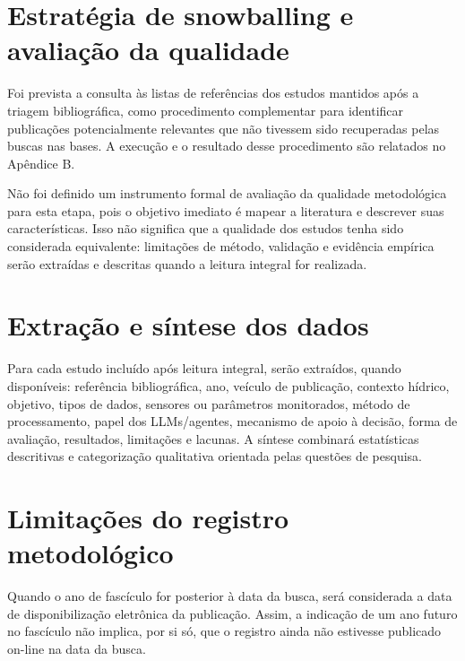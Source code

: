 \section{Estratégia de snowballing e avaliação da qualidade}

Foi prevista a consulta às listas de referências dos estudos mantidos após a
triagem bibliográfica, como procedimento complementar para identificar
publicações potencialmente relevantes que não tivessem sido recuperadas pelas
buscas nas bases. A execução e o resultado desse procedimento são relatados no
Apêndice B.

Não foi definido um instrumento formal de avaliação da qualidade metodológica
para esta etapa, pois o objetivo imediato é mapear a literatura e descrever suas
características. Isso não significa que a qualidade dos estudos tenha sido
considerada equivalente: limitações de método, validação e evidência empírica
serão extraídas e descritas quando a leitura integral for realizada.

\section{Extração e síntese dos dados}

Para cada estudo incluído após leitura integral, serão extraídos, quando
disponíveis: referência bibliográfica, ano, veículo de publicação,
contexto hídrico, objetivo, tipos de dados, sensores ou parâmetros
monitorados, método de processamento, papel dos LLMs/agentes, mecanismo
de apoio à decisão, forma de avaliação, resultados, limitações e lacunas.
A síntese combinará estatísticas descritivas e categorização qualitativa
orientada pelas questões de pesquisa.

\section{Limitações do registro metodológico}

Quando o ano de fascículo for posterior à data da busca, será considerada
a data de disponibilização eletrônica da publicação. Assim, a indicação
de um ano futuro no fascículo não implica, por si só, que o registro ainda
não estivesse publicado on-line na data da busca.
